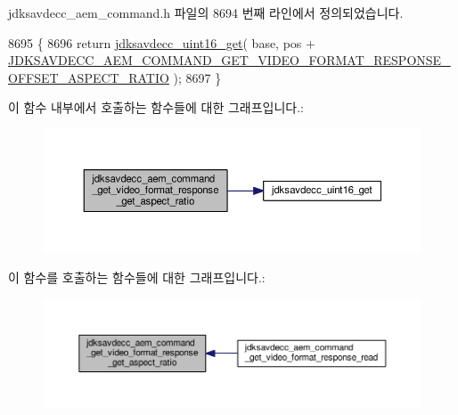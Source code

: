 jdksavdecc\+\_\+aem\+\_\+command.\+h 파일의 8694 번째 라인에서 정의되었습니다.


\begin{DoxyCode}
8695 \{
8696     \textcolor{keywordflow}{return} \hyperlink{group__endian_ga3fbbbc20be954aa61e039872965b0dc9}{jdksavdecc\_uint16\_get}( base, pos + 
      \hyperlink{group__command__get__video__format__response_ga0a5642f617922b5a28527768730f1831}{JDKSAVDECC\_AEM\_COMMAND\_GET\_VIDEO\_FORMAT\_RESPONSE\_OFFSET\_ASPECT\_RATIO}
       );
8697 \}
\end{DoxyCode}


이 함수 내부에서 호출하는 함수들에 대한 그래프입니다.\+:
\nopagebreak
\begin{figure}[H]
\begin{center}
\leavevmode
\includegraphics[width=350pt]{group__command__get__video__format__response_ga118dba39d72903a46a3b8394f396878b_cgraph}
\end{center}
\end{figure}




이 함수를 호출하는 함수들에 대한 그래프입니다.\+:
\nopagebreak
\begin{figure}[H]
\begin{center}
\leavevmode
\includegraphics[width=350pt]{group__command__get__video__format__response_ga118dba39d72903a46a3b8394f396878b_icgraph}
\end{center}
\end{figure}


